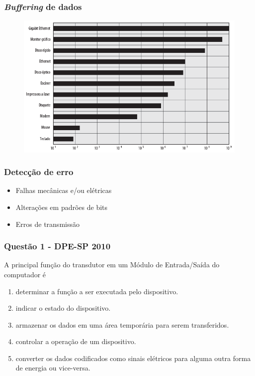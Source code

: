 \documentclass[aspectratio=169,
				xcolor=table]{beamer}
\begin{document}
	\begin{frame}
		\frametitle{\textit{Buffering} de dados}
		
		\begin{figure}[hbtp]
		\centering
		\includegraphics[height=.75\textheight, keepaspectratio]{../figs/cap10/datarate.png}
		\end{figure}
	\end{frame}
	
	\begin{frame}
		\frametitle{Detecção de erro}
		\begin{itemize}
			\item Falhas mecânicas e/ou elétricas
			\vspace{1em}
			\item Alterações em padrões de bits
			\vspace{1em}
			\item Erros de transmissão
		\end{itemize}
	\end{frame}
	
	\begin{frame}
		\frametitle{Questão 1 - DPE-SP 2010}
		A principal função do transdutor em um Módulo de Entrada/Saída do computador é
		\vspace{1em}
		\begin{enumerate}[a]

			\item determinar a função a ser executada pelo dispositivo.
			\item indicar o estado do dispositivo.
			\item armazenar os dados em uma área temporária para serem transferidos.
			\item controlar a operação de um dispositivo.
			\item converter os dados codificados como sinais elétricos para alguma outra forma de energia ou vice-versa.		
		\end{enumerate}
	\end{frame}
	
\end{document}
